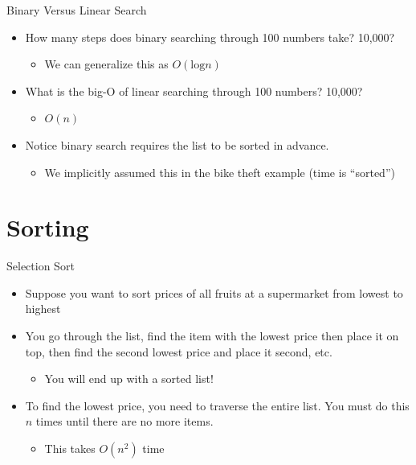 \documentclass[
  ignorenonframetext,
]{beamer}
\providecommand{\tightlist}{%
  \setlength{\itemsep}{0pt}\setlength{\parskip}{0pt}}\usepackage{longtable,booktabs,array}
\begin{document}
\begin{frame}{Binary Versus Linear Search}
\protect\hypertarget{binary-versus-linear-search}{}
\begin{itemize}
\item
  How many steps does binary searching through 100 numbers take? 10,000?

  \begin{itemize}
  \tightlist
  \item
    We can generalize this as \(O(\text{log}n)\)
  \end{itemize}
\item
  What is the big-O of linear searching through 100 numbers? 10,000?

  \begin{itemize}
  \tightlist
  \item
    \(O(n)\)
  \end{itemize}
\item
  Notice binary search requires the list to be sorted in advance.

  \begin{itemize}
  \tightlist
  \item
    We implicitly assumed this in the bike theft example (time is
    ``sorted'')
  \end{itemize}
\end{itemize}
\end{frame}

\hypertarget{sorting}{%
\section{Sorting}\label{sorting}}

\begin{frame}{Selection Sort}
\protect\hypertarget{selection-sort}{}
\begin{itemize}
\item
  Suppose you want to sort prices of all fruits at a supermarket from
  lowest to highest
\item
  You go through the list, find the item with the lowest price then
  place it on top, then find the second lowest price and place it
  second, etc.

  \begin{itemize}
  \tightlist
  \item
    You will end up with a sorted list!
  \end{itemize}
\item
  To find the lowest price, you need to traverse the entire list. You
  must do this \(n\) times until there are no more items.

  \begin{itemize}
  \tightlist
  \item
    This takes \(O(n^2)\) time
  \end{itemize}
\end{itemize}
\end{frame}
\end{document}
